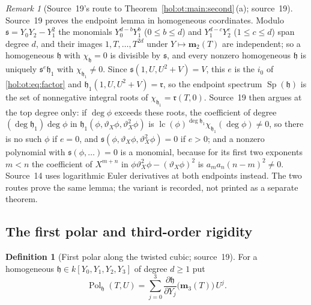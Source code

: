 \documentclass[11pt]{article}
\numberwithin{equation}{section}
\theoremstyle{definition}
\newtheorem{definition}[theorem]{Definition}
\theoremstyle{remark}
\newtheorem{remark}[theorem]{Remark}
\newcommand{\lc}{\operatorname{lc}}
\begin{document}
\begin{remark}[Source~19's route to Theorem~\ref{hol:ot:main:second}\,(a);
source~19]\label{hol:nr:rem:conic}
Source~19 proves the endpoint lemma in homogeneous coordinates. Modulo
$\mathfrak s=Y_0Y_2-Y_1^2$ the monomials $Y_0^{d-b}Y_1^b$ ($0\le b\le d$) and
$Y_1^{d-c}Y_2^c$ ($1\le c\le d$) span degree $d$, and their images
$1,T,\ldots,T^{2d}$ under $Y\mapsto\mathbf m_2(T)$ are independent; so a
homogeneous $\mathfrak h$ with $\chi_{\mathfrak h}=0$ is divisible by
$\mathfrak s$, and every nonzero homogeneous $\mathfrak h$ is uniquely
$\mathfrak s^e\mathfrak h_1$ with $\chi_{\mathfrak h_1}\ne0$. Since
$\mathfrak s(1,U,U^2+V)=V$, this $e$ is the $i_0$ of
\eqref{hol:ot:eq:factor} and $\mathfrak h_1(1,U,U^2+V)=\mathfrak r$, so the
endpoint spectrum $\operatorname{Sp}(\mathfrak h)$ is the set of nonnegative
integral roots of $\chi_{\mathfrak h_1}=\mathfrak r(T,0)$. Source~19 then
argues at the top degree only: if $\deg\phi$ exceeds these roots, the
coefficient of degree $(\deg\mathfrak h_1)\deg\phi$ in
$\mathfrak h_1(\phi,\vartheta_X\phi,\vartheta_X^2\phi)$ is
$\lc(\phi)^{\deg\mathfrak h_1}\chi_{\mathfrak h_1}(\deg\phi)\ne0$, so there
is no such $\phi$ if $e=0$, and
$\mathfrak s(\phi,\vartheta_X\phi,\vartheta_X^2\phi)=0$ if $e>0$; and a nonzero
polynomial with $\mathfrak s(\phi,\ldots)=0$ is a monomial, because for its
first two exponents $m<n$ the coefficient of $X^{m+n}$ in
$\phi\vartheta_X^2\phi-(\vartheta_X\phi)^2$ is $a_ma_n(n-m)^2\ne0$. Source~14
uses logarithmic Euler derivatives at both endpoints instead. The two routes
prove the same lemma; the variant is recorded, not printed as a separate
theorem.
\end{remark}

\subsection{The first polar and third-order rigidity}
\label{hol:nr:sub:polar}

\begin{definition}[First polar along the twisted cubic; source~19]
\label{hol:nr:def:polar}
For a homogeneous $\mathfrak h\in k[Y_0,Y_1,Y_2,Y_3]$ of degree $d\ge1$ put
\begin{equation}\label{hol:nr:eq:polar}
 \operatorname{Pol}_{\mathfrak h}(T,U)=\sum_{j=0}^3
 \frac{\partial\mathfrak h}{\partial Y_j}\bigl(\mathbf m_3(T)\bigr)\,U^j .
\end{equation}
\end{definition}
\end{document}
